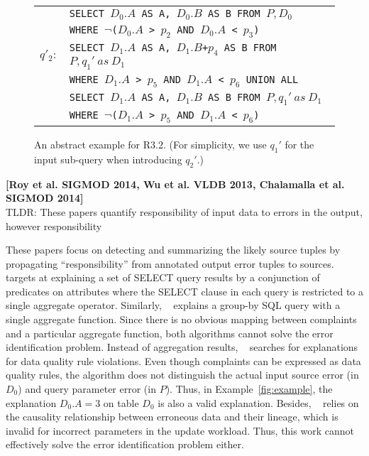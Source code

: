 \begin{figure}[t]
\begin{minipage}[t]{0.22\textwidth}
\begin{tabular}{p{2ex}p{55ex}}
        & \texttt{\small SELECT $D_0.A$ AS A, $D_0.B$ AS B FROM $P, D_0$ }\\
        &\texttt{\small  WHERE $\neg$($D_0.A$ > $p_2$ AND $D_0.A$ < $p_3$)} \\
        $q'_2:$ &
         \texttt{\small SELECT $D_1.A$ AS A, $D_1.B$+$p_4$ AS B FROM $P, q_1'\ as\ D_1$ } \\
        & \texttt{\small WHERE $D_1.A$ > $p_5$ AND $D_1.A$ < $p_6$ UNION ALL}\\
        & \texttt{\small SELECT $D_1.A$ AS A, $D_1.B$ AS B FROM $P, q_1'\ as\ D_1$ }\\
        &\texttt{\small  WHERE $\neg$($D_1.A$ > $p_5$ AND $D_1.A$ < $p_6$)} \\
        \end{tabular}
    \end{minipage}
    \caption{An abstract example for R3.2. (For simplicity, we use $q_1'$ for the input sub-query when introducing $q_2'$.)}
\label{fig:example-cover}
\end{figure}

\noindent \textbf{[Roy et al. SIGMOD 2014, Wu et al. VLDB 2013, Chalamalla et al. SIGMOD 2014]} \\
TLDR: These papers quantify responsibility of input data to errors in the
output, however responsibility


These papers focus on detecting and summarizing the likely source tuples by
propagating ``responsibility'' from annotated output error tuples to sources.
~\cite{Wu13} targets at explaining a set of SELECT query results by a
conjunction of predicates on attributes where the SELECT clause in each query
is restricted to a single aggregate operator. Similarly, ~\cite{roy2014formal}
explains a group-by SQL query with a single aggregate function. Since there is
no obvious mapping between complaints and a particular aggregate function,
both algorithms cannot solve the error identification problem. Instead of
aggregation results, ~\cite{chalamalla2014} searches for explanations for data
quality rule violations. Even though complaints can be expressed as data
quality rules, the algorithm does not distinguish the actual input source
error (in $D_0$) and query parameter error (in $P$). Thus, in
Example~\ref{fig:example}, the explanation $D_0.A = 3$ on table $D_0$ is also
a valid explanation. Besides, ~\cite{chalamalla2014} relies on the causality
relationship between erroneous data and their lineage, which is invalid for
incorrect parameters in the update workload. Thus, this work cannot
effectively solve the error identification problem either.

